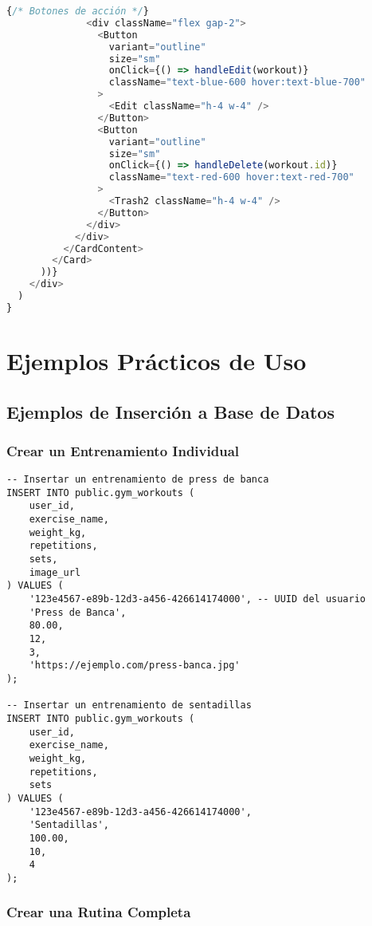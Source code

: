 \documentclass[12pt,a4paper]{article}
\begin{document}
\begin{lstlisting}[language=typescript, caption=components/gym/workout-list.tsx - Estructura principal]
              {/* Botones de acción */}
              <div className="flex gap-2">
                <Button
                  variant="outline"
                  size="sm"
                  onClick={() => handleEdit(workout)}
                  className="text-blue-600 hover:text-blue-700"
                >
                  <Edit className="h-4 w-4" />
                </Button>
                <Button
                  variant="outline"
                  size="sm"
                  onClick={() => handleDelete(workout.id)}
                  className="text-red-600 hover:text-red-700"
                >
                  <Trash2 className="h-4 w-4" />
                </Button>
              </div>
            </div>
          </CardContent>
        </Card>
      ))}
    </div>
  )
}
\end{lstlisting}

\section{Ejemplos Prácticos de Uso}

\subsection{Ejemplos de Inserción a Base de Datos}

\subsubsection{Crear un Entrenamiento Individual}

\begin{lstlisting}[style=sqlstyle, caption=Ejemplo de inserción en gym_workouts]
-- Insertar un entrenamiento de press de banca
INSERT INTO public.gym_workouts (
    user_id,
    exercise_name,
    weight_kg,
    repetitions,
    sets,
    image_url
) VALUES (
    '123e4567-e89b-12d3-a456-426614174000', -- UUID del usuario
    'Press de Banca',
    80.00,
    12,
    3,
    'https://ejemplo.com/press-banca.jpg'
);

-- Insertar un entrenamiento de sentadillas
INSERT INTO public.gym_workouts (
    user_id,
    exercise_name,
    weight_kg,
    repetitions,
    sets
) VALUES (
    '123e4567-e89b-12d3-a456-426614174000',
    'Sentadillas',
    100.00,
    10,
    4
);
\end{lstlisting}

\subsubsection{Crear una Rutina Completa}
\end{document}
